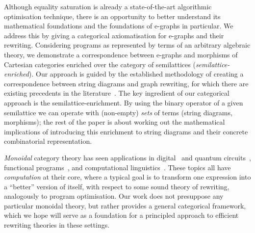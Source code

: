 Although equality saturation is already a state-of-the-art algorithmic optimisation technique, there is an opportunity to better understand its mathematical foundations and the foundations of e-graphs in particular.
We address this by giving a categorical axiomatisation for e-graphs and their rewriting.
Considering programs as represented by terms of an arbitrary algebraic theory, we demonstrate a correspondence between e-graphs and morphisms of Cartesian categories enriched over the category of semilattices (\textit{semilattice-enriched}).
Our approach is guided by the established methodology of creating a correspondence between string diagrams and graph rewriting, for which there are existing precedents in the literature~\cite{bonchi_string_2022-1,bonchi_string_2022-2,bonchi_string_2022-3,fscd,ghica-zanassi2023string}.
The key ingredient of our categorical approach is the semilattice-enrichment.
By using the binary operator of a given semilattice we can operate with (non-empty) \textit{sets} of terms (string diagrams, morphisms); the rest of the paper is about working out the mathematical implications of introducing this enrichment to string diagrams and their concrete combinatorial representation.

\emph{Monoidal} category theory has seen applications in digital~\cite{ghica_compositional_2023} and quantum circuits~\cite{coecke_interacting_2011,ZX}, functional programs~\cite{ghica-zanassi2023string}, and computational linguistics~\cite{wazni_quantum_2022,coecke_lambek_2013}.
These topics all have \emph{computation} at their core, where a typical goal is to transform one expression into a \enquote{better} version of itself, with respect to some sound theory of rewriting, analogously to program optimisation.
Our work does not presuppose any particular monoidal theory, but rather provides a general categorical framework, which we hope will serve as a foundation for a principled approach to efficient rewriting theories in these settings.

